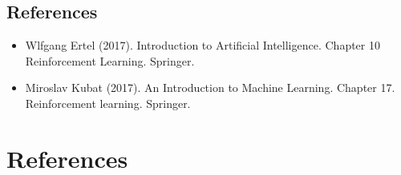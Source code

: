\documentclass[
  letterpaper,
]{scrbook}
\providecommand{\tightlist}{%
  \setlength{\itemsep}{0pt}\setlength{\parskip}{0pt}}
\begin{document}
\section*{References}\label{references-7}


\begin{itemize}
\tightlist
\item
  Wlfgang Ertel (2017). Introduction to Artificial Intelligence. Chapter
  10 Reinforcement Learning. Springer.
\item
  Miroslav Kubat (2017). An Introduction to Machine Learning. Chapter
  17. Reinforcement learning. Springer.
\end{itemize}


\chapter*{References}\label{references-8}

\end{document}
